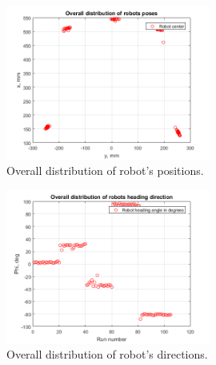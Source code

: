 \documentclass[a4paper, 12pt]{article}
\begin{document}
\begin{figure}[H]
  \centering
  \caption{Overall distribution of robot's positions.\label{fig:pos}}
  \includegraphics[width=0.6\textwidth]{all}
\end{figure}

\begin{figure}[H]
  \centering
  \caption{Overall distribution of robot's directions.\label{fig:direct}}
  \includegraphics[width=0.6\textwidth]{allphi}
\end{figure}
\end{document}
